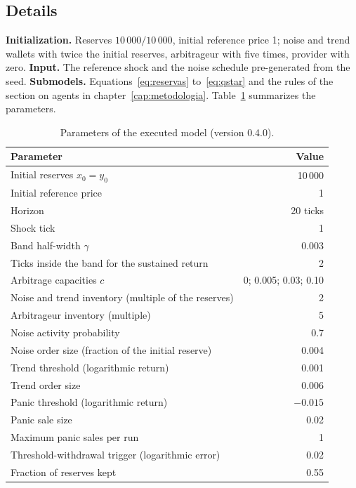 \subsection*{Details}

\textbf{Initialization.} Reserves $10\,000/10\,000$, initial reference price 1; noise and trend wallets with twice the initial reserves, arbitrageur with five times, provider with zero. \textbf{Input.} The reference shock and the noise schedule pre-generated from the seed. \textbf{Submodels.} Equations~\eqref{eq:reservas} to~\eqref{eq:qstar} and the rules of the section on agents in chapter~\ref{cap:metodologia}. Table~\ref{tab:parametros} summarizes the parameters.

\begin{table}[htbp]
\centering
\caption{Parameters of the executed model (version 0.4.0).}
\label{tab:parametros}
\small
\begin{tabular}{@{}lr@{}}
\toprule
Parameter & Value \\
\midrule
Initial reserves $x_0=y_0$ & 10\,000 \\
Initial reference price & 1 \\
Horizon & 20 ticks \\
Shock tick & 1 \\
Band half-width $\gamma$ & 0.003 \\
Ticks inside the band for the sustained return & 2 \\
Arbitrage capacities $c$ & 0; 0.005; 0.03; 0.10 \\
Noise and trend inventory (multiple of the reserves) & 2 \\
Arbitrageur inventory (multiple) & 5 \\
Noise activity probability & 0.7 \\
Noise order size (fraction of the initial reserve) & 0.004 \\
Trend threshold (logarithmic return) & 0.001 \\
Trend order size & 0.006 \\
Panic threshold (logarithmic return) & $-0.015$ \\
Panic sale size & 0.02 \\
Maximum panic sales per run & 1 \\
Threshold-withdrawal trigger (logarithmic error) & 0.02 \\
Fraction of reserves kept & 0.55 \\
\bottomrule
\end{tabular}
\end{table}

